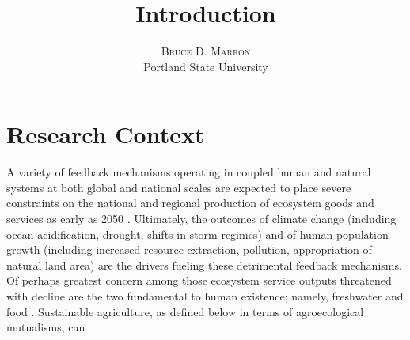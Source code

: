 \documentclass[twoside]{article}	%
\title{\vspace{-15mm}\fontsize{14pt}{10pt}\selectfont\textbf{Introduction}} %
\author{
\large
\textsc{Bruce D. Marron} \\ %
\normalsize Portland State University \\ %
\vspace{-5mm}
}
\date{}
\begin{document}
\maketitle                %
\thispagestyle{fancy}     %





\section{Research Context}
A variety of feedback mechanisms operating in coupled human and natural systems at both global and national scales are expected to place severe constraints on the national and regional production of ecosystem goods and services as early as 2050 \citep{zhao_drought-induced_2010, hoegh-guldberg_impact_2010, eigenbrod_impact_2011}. Ultimately, the outcomes of climate change (including ocean acidification, drought, shifts in storm regimes) and of human population growth (including increased resource extraction, pollution, appropriation of natural land area) are the drivers fueling these detrimental feedback mechanisms. Of perhaps greatest concern among those ecosystem service outputs threatened with decline are the two fundamental to human existence; namely, freshwater and food \citep{dodds_human_2013, rogers_facing_2008, lobell_climate_2011, wada_global_2010, zhao_drought-induced_2010}. Sustainable agriculture, as defined below in terms of agroecological mutualisms, can \citep{godfray_food_2010}\\
\end{document}
